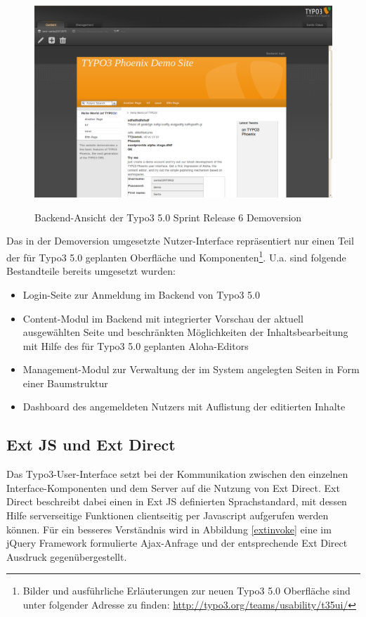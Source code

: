 \begin{figure}[!h]
\begin{center}
\label{fig.typo3backend}
\includegraphics[scale=0.239]{images/typo3/backend.png}
\caption{Backend-Ansicht der Typo3 5.0 Sprint Release 6 Demoversion}
\end{center}
\end{figure}
\newpage
Das in der Demoversion umgesetzte Nutzer-Interface repräsentiert nur einen Teil der für Typo3 5.0 geplanten Oberfläche und Komponenten\footnote{Bilder und ausführliche Erläuterungen zur neuen Typo3 5.0 Oberfläche sind unter folgender Adresse zu finden: \href{http://typo3.org/teams/usability/t35ui/}{http://typo3.org/teams/usability/t35ui/}}. U.a. sind folgende Bestandteile bereits umgesetzt wurden:
\begin{itemize}
\item
Login-Seite zur Anmeldung im Backend von Typo3 5.0
\item
Content-Modul im Backend mit integrierter Vorschau der aktuell ausgewählten Seite und beschränkten Möglichkeiten der Inhaltsbearbeitung mit Hilfe des für Typo3 5.0 geplanten Aloha-Editors
\item
Management-Modul zur Verwaltung der im System angelegten Seiten in Form einer Baumstruktur
\item
Dashboard des angemeldeten Nutzers mit Auflistung der editierten Inhalte
\end{itemize}


\subsection{Ext JS und Ext Direct}

Das Typo3-User-Interface setzt bei der Kommunikation zwischen den einzelnen Interface-Komponenten und dem Server auf die Nutzung von Ext Direct. Ext Direct beschreibt dabei einen in Ext JS definierten Sprachstandard, mit dessen Hilfe serverseitige Funktionen clientseitig per Javascript aufgerufen werden können.
Für ein besseres Verständnis wird in Abbildung \ref{extinvoke} eine im jQuery Framework formulierte Ajax-Anfrage und der entsprechende Ext Direct Ausdruck gegenübergestellt.

